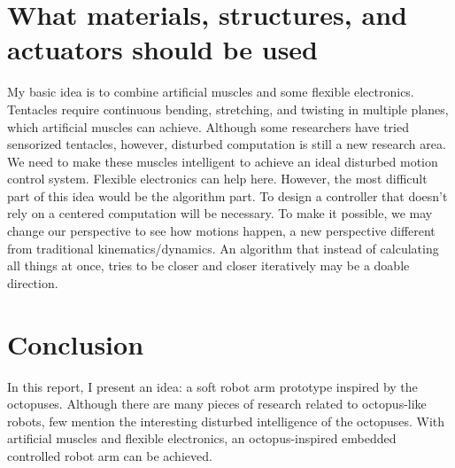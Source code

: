 \documentclass{article}
\begin{document}
\section*{What materials, structures, and actuators should be used}
My basic idea is to combine artificial muscles and some flexible electronics.
Tentacles require continuous bending, stretching, and twisting in multiple planes, which artificial muscles can achieve\cite{fras2018bio}.
Although some researchers have tried sensorized tentacles\cite{xie2023octopus}, however, disturbed computation is still a new research area.
We need to make these muscles intelligent to achieve an ideal disturbed motion control system. Flexible electronics\cite{hui2023green} can help here.
However, the most difficult part of this idea would be the algorithm part.
To design a controller that doesn't rely on a centered computation will be necessary.
To make it possible, we may change our perspective to see how motions happen, a new perspective different from traditional kinematics/dynamics.
An algorithm that instead of calculating all things at once, tries to be closer and closer iteratively may be a doable direction.
\section*{Conclusion}
In this report, I present an idea: a soft robot arm prototype inspired by the octopuses. 
Although there are many pieces of research related to octopus-like robots, few mention the interesting disturbed intelligence of the octopuses.
With artificial muscles and flexible electronics, an octopus-inspired embedded controlled robot arm can be achieved.

\end{document}
